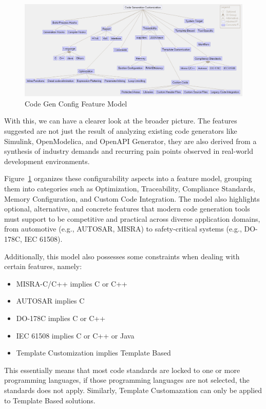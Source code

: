 \begin{figure}[htbp]
	\centering
	\includegraphics[height=0.4\textwidth]{featureModel.png}
	\caption{Code Gen Config Feature Model}
	\label{fig:feature_model}
\end{figure}

With this, we can have a clearer look at the broader picture. The features suggested are not just the result of analyzing existing code generators like Simulink, OpenModelica, and OpenAPI Generator, they are also derived from a synthesis of industry demands and recurring pain points observed in real-world development environments.

Figure~\ref{fig:feature_model} organizes these configurability aspects into a feature model, grouping them into categories such as Optimization, Traceability, Compliance Standards, Memory Configuration, and Custom Code Integration. The model also highlights optional, alternative, and concrete features that modern code generation tools must support to be competitive and practical across diverse application domains, from automotive (e.g., \gls{AUTOSAR}, \gls{MISRA}) to safety-critical systems (e.g., DO-178C, \gls{IEC} 61508).

Additionally, this model also possesses some constraints when dealing with certain features, namely:

\begin{itemize} 
	\item \gls{MISRA}-C/C++ implies C or C++
	\item \gls{AUTOSAR} implies C
	\item DO-178C implies C or C++
	\item \gls{IEC} 61508 implies C or C++ or Java
	\item Template Customization implies Template Based
\end{itemize}

This essentially means that most code standards are locked to one or more programming languages, if those programming languages are not selected, the standards does not apply. Similarly, Template Customazation can only be applied to Template Based solutions.

